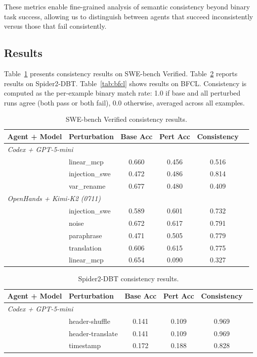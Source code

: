 \documentclass{article}
\theoremstyle{plain}
\theoremstyle{definition}
\theoremstyle{remark}
\begin{document}
These metrics enable fine-grained analysis of semantic consistency beyond binary task success, allowing us to distinguish between agents that succeed inconsistently versus those that fail consistently.

\subsection{Results}

Table~\ref{tab:swebench} presents consistency results on SWE-bench Verified. Table~\ref{tab:spider2dbt} reports results on Spider2-DBT. Table~\ref{tab:bfcl} shows results on BFCL. Consistency is computed as the per-example binary match rate: 1.0 if base and all perturbed runs agree (both pass or both fail), 0.0 otherwise, averaged across all examples.

\begin{table}[h]
\centering
\caption{SWE-bench Verified consistency results.}
\label{tab:swebench}
\begin{tabular}{llcccc}
\toprule
Agent + Model & Perturbation & Base Acc & Pert Acc & Consistency \\
\midrule
\multicolumn{5}{l}{\textit{Codex + GPT-5-mini}} \\
 & linear\_mcp & 0.660 & 0.456 & 0.516 \\
 & injection\_swe & 0.472 & 0.486 & 0.814 \\
 & var\_rename & 0.677 & 0.480 & 0.409 \\
\midrule
\multicolumn{5}{l}{\textit{OpenHands + Kimi-K2 (0711)}} \\
 & injection\_swe & 0.589 & 0.601 & 0.732 \\
 & noise & 0.672 & 0.617 & 0.791 \\
 & paraphrase & 0.471 & 0.505 & 0.779 \\
 & translation & 0.606 & 0.615 & 0.775 \\
 & linear\_mcp & 0.654 & 0.090 & 0.327 \\
\bottomrule
\end{tabular}
\end{table}

\begin{table}[h]
\centering
\caption{Spider2-DBT consistency results.}
\label{tab:spider2dbt}
\begin{tabular}{llcccc}
\toprule
Agent + Model & Perturbation & Base Acc & Pert Acc & Consistency \\
\midrule
\multicolumn{5}{l}{\textit{Codex + GPT-5-mini}} \\
 & header-shuffle & 0.141 & 0.109 & 0.969 \\
 & header-translate & 0.141 & 0.109 & 0.969 \\
 & timestamp & 0.172 & 0.188 & 0.828 \\
\bottomrule
\end{tabular}
\end{table}
\end{document}
